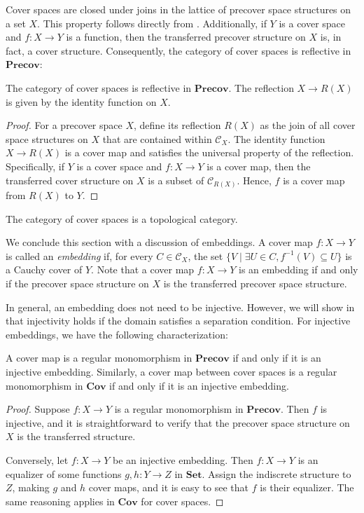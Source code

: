 \documentclass[reqno]{amsart}
\theoremstyle{definition}
\theoremstyle{remark}
\numberwithin{figure}{section}
\newcommand{\cat}[1]{\mathbf{#1}}
\begin{document}
Cover spaces are closed under joins in the lattice of precover space structures on a set $X$.
This property follows directly from .
Additionally, if $Y$ is a cover space and $f : X \to Y$ is a function, then the transferred precover structure on $X$ is, in fact, a cover structure.
Consequently, the category of cover spaces is reflective in $\cat{Precov}$:

\begin{prop}
The category of cover spaces is reflective in $\cat{Precov}$.
The reflection $X \to R(X)$ is given by the identity function on $X$.
\end{prop}
\begin{proof}
For a precover space $X$, define its reflection $R(X)$ as the join of all cover space structures on $X$ that are contained within $\mathcal{C}_X$.
The identity function $X \to R(X)$ is a cover map and satisfies the universal property of the reflection.
Specifically, if $Y$ is a cover space and $f : X \to Y$ is a cover map, then the transferred cover structure on $X$ is a subset of $\mathcal{C}_{R(X)}$.
Hence, $f$ is a cover map from $R(X)$ to $Y$.
\end{proof}

\begin{cor}
The category of cover spaces is a topological category.
\end{cor}

We conclude this section with a discussion of embeddings.
A cover map $f : X \to Y$ is called an \emph{embedding} if, for every $C \in \mathcal{C}_X$,
the set $\{ V \mid \exists U \in C, f^{-1}(V) \subseteq U \}$ is a Cauchy cover of $Y$.
Note that a cover map $f : X \to Y$ is an embedding if and only if the precover space structure on $X$ is the transferred precover space structure.

In general, an embedding does not need to be injective.
However, we will show in  that injectivity holds if the domain satisfies a separation condition.
For injective embeddings, we have the following characterization:

\begin{prop}
A cover map is a regular monomorphism in $\cat{Precov}$ if and only if it is an injective embedding.
Similarly, a cover map between cover spaces is a regular monomorphism in $\cat{Cov}$ if and only if it is an injective embedding.
\end{prop}
\begin{proof}
Suppose $f : X \to Y$ is a regular monomorphism in $\cat{Precov}$.
Then $f$ is injective, and it is straightforward to verify that the precover space structure on $X$ is the transferred structure.

Conversely, let $f : X \to Y$ be an injective embedding.
Then $f : X \to Y$ is an equalizer of some functions $g,h : Y \to Z$ in $\cat{Set}$.
Assign the indiscrete structure to $Z$, making $g$ and $h$ cover maps, and it is easy to see that $f$ is their equalizer.
The same reasoning applies in $\cat{Cov}$ for cover spaces.
\end{proof}
\end{document}

